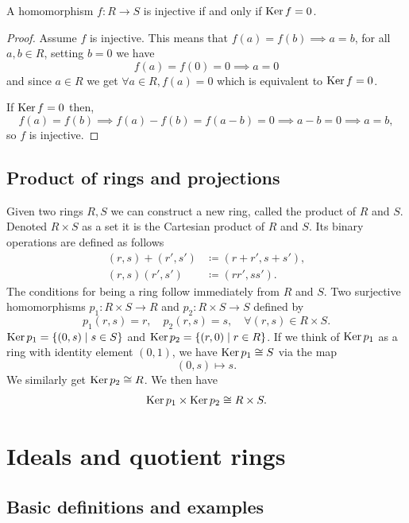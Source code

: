 \documentclass[10pt, a4paper]{article}
\begin{document}
\begin{lemma}
    A homomorphism $f : R \to S$ is injective if and only if $\operatorname{Ker}{f} = 0$.

    \begin{proof}
        Assume $f$ is injective.
        This means that $f(a) = f(b) \implies a = b$,
        for all $a, b \in R$,
        setting $b = 0$ we have
        \[
        f(a) = f(0) = 0 \implies a = 0
        \]
        and since $a \in R$ we get $\forall a \in R, f(a) = 0$ which is equivalent to $\operatorname{Ker}{f} = 0$.

        If $\operatorname{Ker}{f} = 0$ then,
        \[
        f(a) = f(b) \implies f(a) - f(b) = f(a - b) = 0 \implies a - b = 0 \implies a = b,
        \]
        so $f$ is injective.
    \end{proof}
\end{lemma}

\subsection{Product of rings and projections}
Given two rings $R, S$ we can construct a new ring,
called the product of $R$ and $S$.
Denoted $R \times S$ as a set it is the Cartesian product of $R$ and $S$.
Its binary operations are defined as follows
\begin{align*}
    (r, s) + (r', s') &\coloneqq (r + r', s + s'), \\
    (r, s)(r', s') &\coloneqq (rr', ss').
\end{align*}
The conditions for being a ring follow immediately from $R$ and $S$.
Two surjective homomorphisms $p_1 : R \times S \to R$ and $p_2 : R \times S \to S$ defined by
\[
p_1(r, s) = r,\quad p_2(r, s) = s,\quad\forall (r, s) \in R \times S.
\]
$\operatorname{Ker}{p_1} = \{(0, s)\mid s \in S\}$ and $\operatorname{Ker}{p_2} = \{(r, 0)\mid r \in R\}$.
If we think of $\operatorname{Ker}{p_1}$ as a ring with identity element $(0, 1)$,
we have $\operatorname{Ker}{p_1} \cong S$ via the map
\[
(0, s) \mapsto s.
\]
We similarly get $\operatorname{Ker}{p_2} \cong R$.
We then have
\[
\operatorname{Ker}{p_1} \times \operatorname{Ker}{p_2} \cong R \times S.
\]

\newpage

\section{Ideals and quotient rings}

\subsection{Basic definitions and examples}
\end{document}
